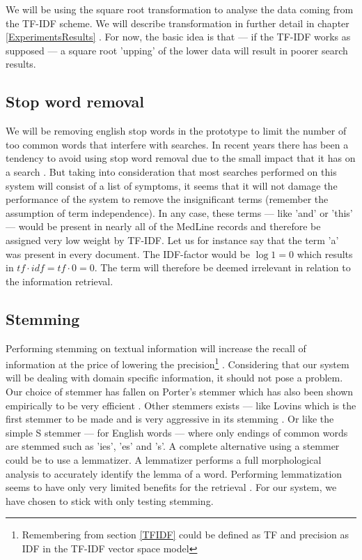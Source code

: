 We will be using the square root transformation to analyse the data
coming from the TF-IDF scheme. We will describe transformation in
further detail in chapter \ref{ExperimentsResults} . For now, the basic idea is that --- if the TF-IDF
works as supposed --- a square root 'upping' of the lower data will
result in poorer search results.

\subsection{Stop word removal}

We will be removing english stop words in the prototype to limit the
number of too common words that interfere with searches. In recent
years there has been a tendency to avoid using stop word removal due
to the small impact that it has on a search \cite{IntroIR2009}. But
taking into consideration that most searches performed on this system
will consist of a list of symptoms, it seems that it will not damage
the performance of the system to remove the insignificant terms
(remember the assumption of term independence). In any case, these
terms --- like 'and' or 'this' --- would be present in nearly all of
the MedLine records and therefore be assigned very low weight by
TF-IDF. Let us for instance say that the term 'a' was present in every
document. The IDF-factor would be $\log 1 = 0$ which results in
$\mathit{tf} \cdot \mathit{idf} = \mathit{tf} \cdot 0 = 0$. The term
will therefore be deemed irrelevant in relation to the information
retrieval.

\subsection{Stemming}

Performing stemming on textual information will increase the recall of
information at the price of lowering the
precision\footnote{Remembering from section \ref{TFIDF} could be
  defined as TF and precision as IDF in the TF-IDF vector space model}
\cite{IntroIR2009}. Considering that our system will be dealing with
domain specific information, it should not pose a problem. Our choice
of stemmer has fallen on Porter's stemmer which has also been shown
empirically to be very efficient \cite{IntroIR2009}. Other stemmers
exists --- like Lovins which is the first stemmer to be made and is
very aggressive in its stemming \cite{Kurz2002309}. Or like the simple
S stemmer --- for English words --- where only endings of common words
are stemmed such as 'ies', 'es' and 's'. A complete alternative using
a stemmer could be to use a lemmatizer. A lemmatizer performs a full
morphological analysis to accurately identify the lemma of a word. Performing
lemmatization seems to have only very limited benefits for the
retrieval \cite{IntroIR2009}. For our system, we have chosen to stick with only
testing stemming.

